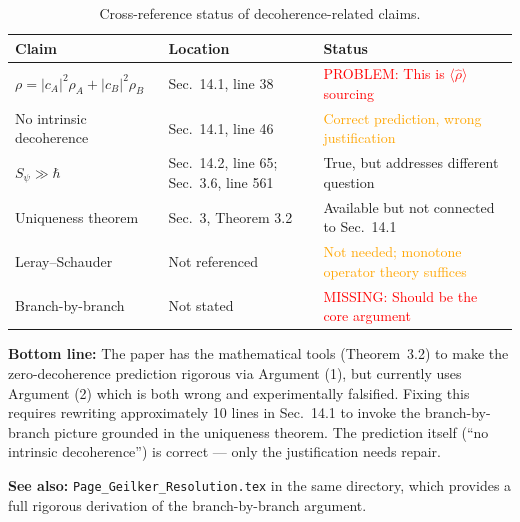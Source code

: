 \documentclass[11pt,a4paper]{article}
\begin{document}
\begin{table}[h]
\centering
\caption{Cross-reference status of decoherence-related claims.}
\begin{tabular}{p{4cm}p{3cm}p{5cm}}
\toprule
\textbf{Claim} & \textbf{Location} & \textbf{Status} \\
\midrule
$\rho = |c_A|^2\rho_A + |c_B|^2\rho_B$ &
Sec.~14.1, line 38 &
\textcolor{red}{PROBLEM: This is $\langle\hat\rho\rangle$ sourcing} \\
No intrinsic decoherence &
Sec.~14.1, line 46 &
\textcolor{orange}{Correct prediction, wrong justification} \\
$S_\psi \gg \hbar$ &
Sec.~14.2, line 65; Sec.~3.6, line 561 &
\textcolor{green!60!black}{True, but addresses different question} \\
Uniqueness theorem &
Sec.~3, Theorem 3.2 &
\textcolor{green!60!black}{Available but not connected to Sec.~14.1} \\
Leray--Schauder &
Not referenced &
\textcolor{orange}{Not needed; monotone operator theory suffices} \\
Branch-by-branch &
Not stated &
\textcolor{red}{MISSING: Should be the core argument} \\
\bottomrule
\end{tabular}
\end{table}

\vspace{1em}
\noindent\textbf{Bottom line:} The paper has the mathematical tools
(Theorem~3.2) to make the zero-decoherence prediction rigorous via
Argument (1), but currently uses Argument (2) which is both wrong and
experimentally falsified. Fixing this requires rewriting approximately
10 lines in Sec.~14.1 to invoke the branch-by-branch picture grounded
in the uniqueness theorem. The prediction itself (``no intrinsic
decoherence'') is correct --- only the justification needs repair.

\noindent\textbf{See also:}
\texttt{Page\_Geilker\_Resolution.tex} in the same directory, which
provides a full rigorous derivation of the branch-by-branch argument.
\end{document}
